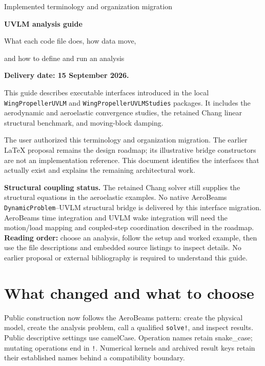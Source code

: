 \documentclass[11pt,a4paper]{article}
\newcommand{\code}{\nolinkurl}
\begin{document}
\begin{titlepage}
\vspace*{22mm}
{\Large Implemented terminology and organization migration\par}
\vspace{10mm}
{\Huge\bfseries UVLM analysis guide\par}
\vspace{8mm}
{\Large What each code file does, how data move,\par
and how to define and run an analysis\par}
\vspace{15mm}
\textbf{Delivery date: 15 September 2026.}

This guide describes executable interfaces introduced in the local
\code{WingPropellerUVLM} and \code{WingPropellerUVLMStudies} packages.
It includes the aerodynamic and aeroelastic convergence studies, the retained
Chang linear structural benchmark, and moving-block damping.

The user authorized this terminology and organization migration. The earlier
LaTeX proposal remains the design roadmap; its illustrative bridge constructors
are not an implementation reference. This document identifies the interfaces
that actually exist and explains the remaining architectural work.

\textbf{Structural coupling status.} The retained Chang solver still supplies
the structural equations in the aeroelastic examples. No native AeroBeams
\code{DynamicProblem}--UVLM structural bridge is delivered by this interface
migration. AeroBeams time integration and UVLM wake integration will need the
motion/load mapping and coupled-step coordination described in the roadmap.
\vfill
\textbf{Reading order:} choose an analysis, follow the setup and worked example,
then use the file descriptions and embedded source listings to inspect details.
No earlier proposal or external bibliography is required to understand this guide.
\end{titlepage}
\tableofcontents\clearpage

\section{What changed and what to choose}

Public construction now follows the AeroBeams pattern: create the physical
model, create the analysis problem, call a qualified \code{solve!}, and inspect
results. Public descriptive settings use camelCase. Operation names retain
snake\_case; mutating operations end in \code{!}. Numerical kernels and archived
result keys retain their established names behind a compatibility boundary.
\end{document}
